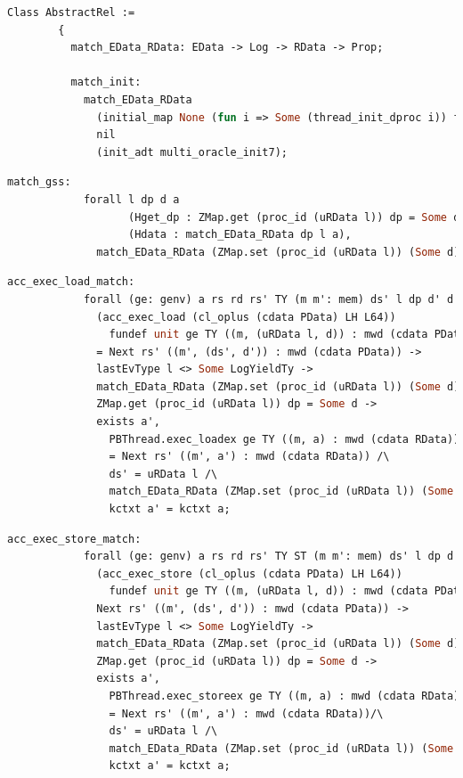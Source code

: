 \begin{lstlisting}[language=Caml]
      Class AbstractRel :=
        {
          match_EData_RData: EData -> Log -> RData -> Prop;

          match_init:
            match_EData_RData
              (initial_map None (fun i => Some (thread_init_dproc i)) full_thread_list)
              nil
              (init_adt multi_oracle_init7);
\end{lstlisting}
         
\begin{lstlisting}[language=Caml]          
          match_gss:
            forall l dp d a
                   (Hget_dp : ZMap.get (proc_id (uRData l)) dp = Some d)
                   (Hdata : match_EData_RData dp l a),
              match_EData_RData (ZMap.set (proc_id (uRData l)) (Some d) dp) l a;
\end{lstlisting}
         
\begin{lstlisting}[language=Caml]          
          acc_exec_load_match:
            forall (ge: genv) a rs rd rs' TY (m m': mem) ds' l dp d' d addr,
              (acc_exec_load (cl_oplus (cdata PData) LH L64)) 
                fundef unit ge TY ((m, (uRData l, d)) : mwd (cdata PData)) addr rs rd 
              = Next rs' ((m', (ds', d')) : mwd (cdata PData)) ->
              lastEvType l <> Some LogYieldTy ->
              match_EData_RData (ZMap.set (proc_id (uRData l)) (Some d) dp) l a ->
              ZMap.get (proc_id (uRData l)) dp = Some d ->
              exists a',
                PBThread.exec_loadex ge TY ((m, a) : mwd (cdata RData)) addr rs rd 
                = Next rs' ((m', a') : mwd (cdata RData)) /\
                ds' = uRData l /\
                match_EData_RData (ZMap.set (proc_id (uRData l)) (Some d') dp) l a' /\
                kctxt a' = kctxt a;
\end{lstlisting}
         
\begin{lstlisting}[language=Caml]     
          acc_exec_store_match:
            forall (ge: genv) a rs rd rs' TY ST (m m': mem) ds' l dp d' d addr,
              (acc_exec_store (cl_oplus (cdata PData) LH L64)) 
                fundef unit ge TY ((m, (uRData l, d)) : mwd (cdata PData)) addr rs rd ST =
              Next rs' ((m', (ds', d')) : mwd (cdata PData)) -> 
              lastEvType l <> Some LogYieldTy ->
              match_EData_RData (ZMap.set (proc_id (uRData l)) (Some d) dp) l a ->
              ZMap.get (proc_id (uRData l)) dp = Some d ->
              exists a',
                PBThread.exec_storeex ge TY ((m, a) : mwd (cdata RData)) addr rs rd ST 
                = Next rs' ((m', a') : mwd (cdata RData))/\
                ds' = uRData l /\
                match_EData_RData (ZMap.set (proc_id (uRData l)) (Some d') dp) l a' /\
                kctxt a' = kctxt a;
\end{lstlisting}
         
